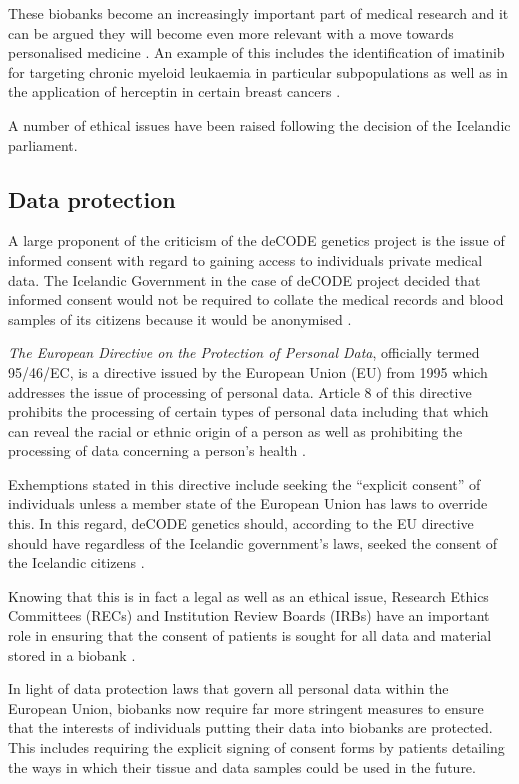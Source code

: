 \documentclass[british,a4paper, 12pt]{article}
\begin{document}
These biobanks become an increasingly important part of medical research and 
it can be argued they will become even more relevant with a move towards 
personalised medicine \parencite{watson2010integrating}. An example of this
includes the identification of imatinib for targeting chronic myeloid leukaemia 
in particular subpopulations \parencite{cohen2002approval} as well as in the
application of herceptin in certain breast cancers \parencite{lemieux2009role}.

A number of ethical issues have been raised following the decision of the Icelandic parliament.

\subsection{Data protection}
A large proponent of the criticism of the deCODE genetics project is the issue
of informed consent with regard to gaining access to individuals private
medical data. The Icelandic Government in the case of deCODE project decided that informed
consent would not be required to collate the medical records and blood samples 
of its citizens because it would be anonymised \parencite{chadwick1999icelandic}.

\emph{The European Directive on the Protection of Personal Data}, officially 
termed 95/46/EC, is a directive issued by the European Union (EU) from 1995 which 
addresses the issue of processing of personal data. Article 8 of this directive 
prohibits the processing of certain types of personal data including that which
can reveal the racial or ethnic origin of a person as well as prohibiting the 
processing of data concerning a person's health \parencite{directive199595}.

Exhemptions stated in this directive include seeking the ``explicit consent'' 
of individuals unless a member state of the European Union has laws to override 
this. In this regard, deCODE genetics should, according to the EU directive 
should have regardless of the Icelandic government's laws, seeked the consent of 
the Icelandic citizens \parencite{carey2009data}.

Knowing that this is in fact a legal as well as an ethical issue, Research Ethics 
Committees (RECs) and Institution Review Boards (IRBs) have an important role in 
ensuring that the consent of patients is sought for all data and material stored in a
biobank \parencite{watson2010integrating}.

In light of data protection laws that govern all personal data within the European Union,
biobanks now require far more stringent measures to ensure that the interests of individuals
putting their data into biobanks are protected. This includes requiring the explicit signing of
consent forms by patients detailing the ways in which their tissue and data samples could
be used in the future.
\end{document}
